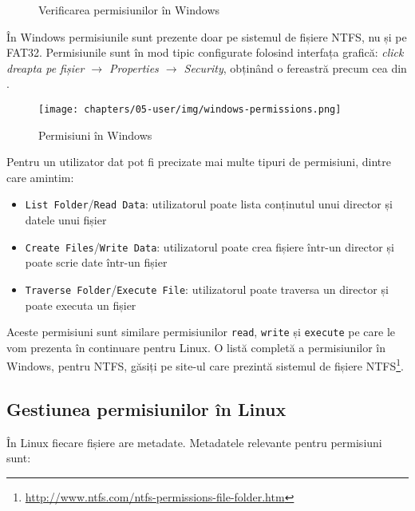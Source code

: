 \begin{figure}[htbp]
	\centering
	\def\svgwidth{0.9\columnwidth}
	
	\caption{Verificarea permisiunilor în Windows}
	\label{fig:user:windows-check-perm}
\end{figure}

În Windows permisiunile sunt prezente doar pe sistemul de fișiere NTFS, nu și pe FAT32. Permisiunile sunt în mod tipic configurate folosind
interfața grafică: \textit{click dreapta pe fișier $\rightarrow$ Properties $\rightarrow$ Security}, obținând o
fereastră precum cea din .

\begin{figure}[!htbp]
	\centering
        \texttt{[image: chapters/05-user/img/windows-permissions.png]}
        \caption{Permisiuni în Windows}
        \label{fig:user:windows-permissions}
\end{figure}

Pentru un utilizator dat pot fi precizate mai multe tipuri de permisiuni, dintre
care amintim:

\begin{itemize}
  \item \texttt{List Folder}/\texttt{Read Data}: utilizatorul poate lista conținutul unui
		director și datele unui fișier
  \item \texttt{Create Files}/\texttt{Write Data}: utilizatorul poate crea fișiere într-un
		director și poate scrie date într-un fișier
  \item \texttt{Traverse Folder}/\texttt{Execute File}: utilizatorul poate traversa un
		director și poate executa un fișier
\end{itemize}

Aceste permisiuni sunt similare permisiunilor \texttt{read}, \texttt{write} și \texttt{execute} pe care le
vom prezenta în continuare pentru Linux. O listă completă a permisiunilor în
Windows, pentru NTFS, găsiți pe site-ul care prezintă sistemul de fișiere NTFS\footnote{\url{http://www.ntfs.com/ntfs-permissions-file-folder.htm}}.

\subsection{Gestiunea permisiunilor în Linux}
\label{sec:user:linux-perm}

În Linux fiecare fișiere are metadate. Metadatele relevante pentru permisiuni sunt:

